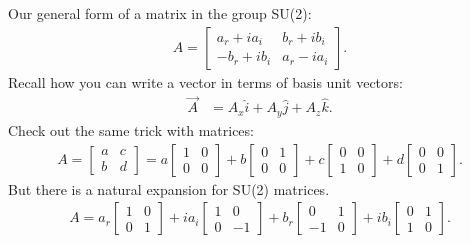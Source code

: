 \documentclass[../../note.tex]{subfiles}
\begin{document}
Our general form of a matrix in the group SU(2):
\begin{align}
    A=
    \left[\begin{matrix}
        a_r + i a_i & b_r + i b_i \\
        -b_r + i b_i & a_r - i a_i   
       \end{matrix}\right].
\end{align}
Recall how you can write a vector in terms of basis unit vectors:
\begin{align}
    \overrightarrow{A}
    &= A_x \hat{i} + A_y \hat{j} + A_z \hat{k}.
\end{align}
Check out the same trick with matrices:
\begin{align}
    A=
    \left[\begin{matrix}
        a & c \\
        b & d   
       \end{matrix}\right]
    =
    a\left[\begin{matrix}
        1 & 0 \\
        0 & 0   
       \end{matrix}\right]
       +
       b\left[\begin{matrix}
        0 & 1 \\
        0 & 0   
       \end{matrix}\right]
       +    
       c\left[\begin{matrix}
        0 & 0 \\
        1 & 0   
       \end{matrix}\right]
       +
       d\left[\begin{matrix}
        0 & 0 \\
        0 & 1   
       \end{matrix}\right].
\end{align}
But there is a natural expansion for SU(2) matrices.
\begin{align}
    A=
    a_r\left[\begin{matrix}
        1 & 0 \\
        0 & 1   
       \end{matrix}\right]
       +
       i a_i\left[\begin{matrix}
        1 & 0 \\
        0 & -1   
       \end{matrix}\right]
       +    
       b_r\left[\begin{matrix}
        0 & 1 \\
        -1 & 0   
       \end{matrix}\right]
       +
       i b_i\left[\begin{matrix}
        0 & 1 \\
        1 & 0   
       \end{matrix}\right].
\end{align}
\end{document}
